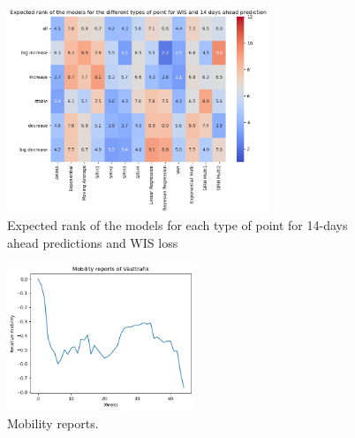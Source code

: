 \begin{figure}[h]
    \centering
    \includegraphics[width=0.7\textwidth]{figures/heatmap_WIS_14.png}
    \caption{Expected rank of the models for each type of point for 14-days ahead predictions and WIS loss}
    \label{fig:heatmap_WIS_14}
\end{figure}



\begin{figure}[h]
    \centering
    \includegraphics[width=0.5\textwidth]{figures/mobility_reports.png}
    \caption{Mobility reports.}
    \label{fig:mobility_reports}
\end{figure}



